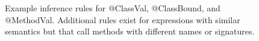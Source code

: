 \begin{figure}[t!]
\begin{center}
\begin{small}
\begin{tabular}{c}
\end{tabular}
\end{small}
\end{center}
\caption{\label{fig:reflection-inference}%
Example inference rules for @ClassVal, @ClassBound, and @MethodVal.
Additional rules exist for expressions with similar semantics but that call
methods with different names or signatures.
}
\end{figure}
